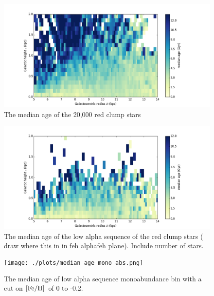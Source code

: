 \documentclass[12pt, preprint]{aastex}
\newcommand{\feh}{\mbox{$\rm [Fe/H]$}}
\begin{document}
\begin{figure}[p!]
\centering
    \includegraphics[scale=0.45]{./plots/median_age_abs.png}
    \caption{The median age of the 20,000 red clump stars  }
\label{fig:alphabins}
\vspace{-60pt}
\end{figure}

\begin{figure}[p!]
\centering
    \includegraphics[scale=0.45]{./plots/median_age_low_alpha_abs.png}
    \caption{The median age of the low alpha sequence of the red clump stars ( draw where this in in feh alphafeh plane). Include number of stars. }
\label{fig:alphabins}
\vspace{-60pt}
\end{figure}

\begin{figure}[p!]
\centering
    \texttt{[image: ./plots/median\_age\_mono\_abs.png]}
    \caption{The median age of low alpha sequence monoabundance  bin with a cut on  \feh\ of 0 to -0.2. }
\label{fig:alphabins}
\end{figure}
\end{document}
